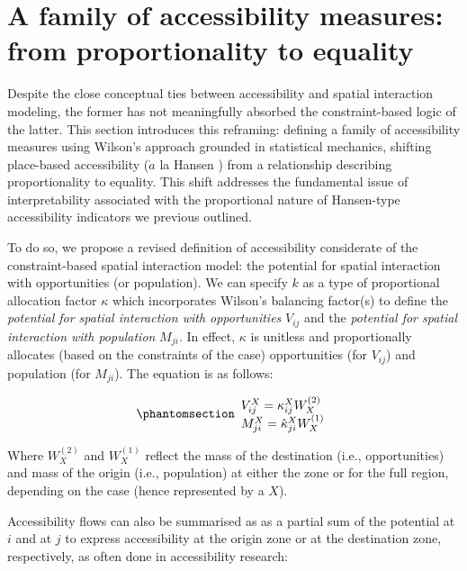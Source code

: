 \documentclass[
  10pt,
  letterpaper,
]{article}
\begin{document}
\section{A family of accessibility measures: from proportionality to
equality}\label{a-family-of-accessibility-measures-from-proportionality-to-equality}

Despite the close conceptual ties between accessibility and spatial
interaction modeling, the former has not meaningfully absorbed the
constraint-based logic of the latter. This section introduces this
reframing: defining a family of accessibility measures using Wilson's
approach grounded in statistical mechanics, shifting place-based
accessibility (\(\grave{a}\) la Hansen \citep{hansen1959}) from a
relationship describing proportionality to equality. This shift
addresses the fundamental issue of interpretability associated with the
proportional nature of Hansen-type accessibility indicators we previous
outlined.

To do so, we propose a revised definition of accessibility considerate
of the constraint-based spatial interaction model: the potential for
spatial interaction with opportunities (or population). We can specify
\(k\) as a type of proportional allocation factor \(\kappa\) which
incorporates Wilson's balancing factor(s) to define the \emph{potential
for spatial interaction with opportunities} \(V_{ij}\) and the
\emph{potential for spatial interaction with population} \(M_{ji}\). In
effect, \(\kappa\) is unitless and proportionally allocates (based on
the constraints of the case) opportunities (for \(V_{ij}\)) and
population (for \(M_{ji}\)). The equation is as follows:

\begin{equation}\phantomsection\label{eq-access-01}{
\begin{array}{l}
V_{ij}^X = \kappa_{ij}^X W_X^{(2)}\\ 
M_{ji}^X = \hat \kappa_{ji}^X W_X^{(1)}
\end{array}
}\end{equation}

\noindent Where \(W_X^{(2)}\) and \(W_X^{(1)}\) reflect the mass of the
destination (i.e., opportunities) and mass of the origin (i.e.,
population) at either the zone or for the full region, depending on the
case (hence represented by a \(X\)).

Accessibility flows can also be summarised as as a partial sum of the
potential at \(i\) and at \(j\) to express accessibility at the origin
zone or at the destination zone, respectively, as often done in
accessibility research:
\end{document}
